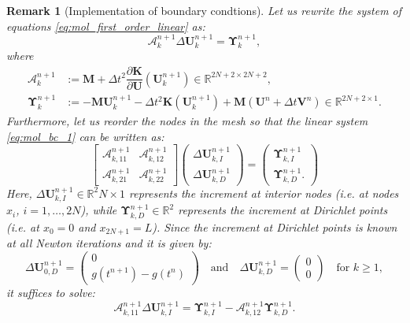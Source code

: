 \documentclass{sfuthesis}
\numberwithin{equation}{section}
\numberwithin{figure}{chapter}
\numberwithin{table}{chapter}
\newtheorem{remark}[theorem]{Remark}
\theoremstyle{definition}
\def\*#1{{\mathbf{#1}}} %
\newcommand{\pder}[2]{\dfrac{\partial #1}{\partial #2}}
\newcommand{\R}{\mathbb{R}}
\begin{document}
\begin{remark}[Implementation of boundary condtions]
    Let us rewrite the system of equations \eqref{eq:mol_first_order_linear} as:
    \begin{equation} \label{eq:mol_bc_1}
        \bm{\mathcal{A}}_k^{n+1} \Delta \*U_{k}^{n+1} = \bm{\Upsilon}_k^{n+1},
    \end{equation}
    where
    \begin{subequations}
        \begin{align}
            \bm{\mathcal{A}}_k^{n+1} &:= \*M + \Delta t^2 \pder{\*K}{\*U}(\*U_k^{n+1}) \in \R^{2N+2 \times 2N+2}, \\
            \bm{\Upsilon}_k^{n+1} &:= - \*M \*U_k^{n+1} - \Delta t^2 \*K(\*U_k^{n+1}) + \*M(\*U^n + \Delta t \*V^n) \in \R^{2N+2 \times 1}.
        \end{align}    
    \end{subequations}
    Furthermore, let us reorder the nodes in the mesh so that the linear system \eqref{eq:mol_bc_1} can be written as:
    \begin{equation}
        \begin{bmatrix}
            \bm{\mathcal{A}}_{k,11}^{n+1} & \bm{\mathcal{A}}_{k,12}^{n+1} \\
            \bm{\mathcal{A}}_{k,21}^{n+1} & \bm{\mathcal{A}}_{k,22}^{n+1}
        \end{bmatrix}
        \begin{pmatrix}
            \Delta \*U_{k,I}^{n+1} \\ \Delta \*U_{k,D}^{n+1}
        \end{pmatrix} = 
        \begin{pmatrix}
            \bm{\Upsilon}_{k,I}^{n+1} \\ \bm{\Upsilon}_{k,D}^{n+1}.
        \end{pmatrix}
    \end{equation}
    Here, $\Delta \*U_{k,I}^{n+1} \in \R^2N \times 1$ represents the increment at interior nodes (i.e. at nodes $x_i$, $i=1,\dots,2N$), while $\bm{\Upsilon}_{k,D}^{n+1} \in \R^2$ represents the increment at Dirichlet points (i.e. at $x_0 = 0$ and $x_{2N+1} = L$). Since the increment at Dirichlet points is known at all Newton iterations and it is given by:
    \begin{equation}
        \Delta \*U_{0,D}^{n+1} = \begin{pmatrix}
            0 \\ g(t^{n+1}) - g(t^n)
        \end{pmatrix} \quad \text{and} \quad \Delta \*U_{k,D}^{n+1} = \begin{pmatrix}
            0 \\ 0
        \end{pmatrix} \quad \text{for } k \geq 1,
    \end{equation}
    it suffices to solve:
    \begin{equation}
        \bm{\mathcal{A}}_{k,11}^{n+1} \Delta \*U_{k,I}^{n+1} = \bm{\Upsilon}_{k,I}^{n+1} - \bm{\mathcal{A}}_{k,12}^{n+1} \bm{\Upsilon}_{k,D}^{n+1}.
    \end{equation}
\end{remark}
\end{document}
